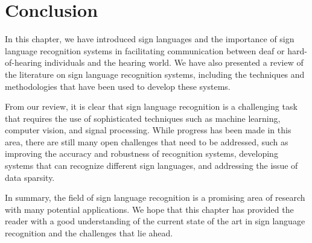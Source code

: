 \section{Conclusion}
In this chapter, we have introduced sign languages and the importance of sign language recognition systems in facilitating communication between deaf or hard-of-hearing individuals and the hearing world. We have also presented a review of the literature on sign language recognition systems, including the techniques and methodologies that have been used to develop these systems.

From our review, it is clear that sign language recognition is a challenging task that requires the use of sophisticated techniques such as machine learning, computer vision, and signal processing. While progress has been made in this area, there are still many open challenges that need to be addressed, such as improving the accuracy and robustness of recognition systems, developing systems that can recognize different sign languages, and addressing the issue of data sparsity.

In summary, the field of sign language recognition is a promising area of research with many potential applications. We hope that this chapter has provided the reader with a good understanding of the current state of the art in sign language recognition and the challenges that lie ahead.